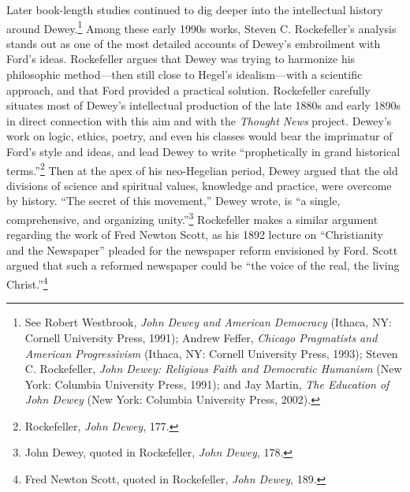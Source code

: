 \documentclass[openany,nobib]{tufte-book}
\begin{document}
Later book-length studies continued to dig deeper into the intellectual
history around Dewey.\footnote{See Robert Westbrook, \emph{John Dewey
  and American Democracy} (Ithaca, NY: Cornell University Press, 1991);
  Andrew Feffer, \emph{Chicago Pragmatists and American Progressivism}
  (Ithaca, NY: Cornell University Press, 1993); Steven C. Rockefeller,
  \emph{John Dewey: Religious Faith and Democratic Humanism} (New York:
  Columbia University Press, 1991); and Jay Martin, \emph{The Education
  of John Dewey} (New York: Columbia University Press, 2002).} Among
these early 1990s works, Steven C. Rockefeller's analysis stands out as
one of the most detailed accounts of Dewey's embroilment with Ford's
ideas. Rockefeller argues that Dewey was trying to harmonize his
philosophic method---then still close to Hegel's idealism---with a
scientific approach, and that Ford provided a practical solution.
Rockefeller carefully situates most of Dewey's intellectual production
of the late 1880s and early 1890s in direct connection with this aim and
with the \emph{Thought News} project. Dewey's work on logic, ethics,
poetry, and even his classes would bear the imprimatur of Ford's style
and ideas, and lead Dewey to write ``prophetically in grand historical
terms.''\footnote{Rockefeller, \emph{John Dewey}, 177.} Then at the apex
of his neo-Hegelian period, Dewey argued that the old divisions of
science and spiritual values, knowledge and practice, were overcome by
history. ``The secret of this movement,'' Dewey wrote, is ``a single,
comprehensive, and organizing unity.''\footnote{John Dewey, quoted in
  Rockefeller, \emph{John Dewey}, 178.} Rockefeller makes a similar
argument regarding the work of Fred Newton Scott, as his 1892 lecture on
``Christianity and the Newspaper'' pleaded for the newspaper reform
envisioned by Ford. Scott argued that such a reformed newspaper could be
``the voice of the real, the living Christ.''\footnote{Fred Newton
  Scott, quoted in Rockefeller, \emph{John Dewey}, 189.}
\end{document}
